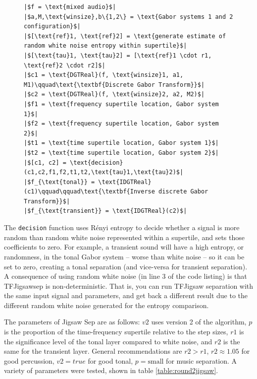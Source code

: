 \documentclass[letter,12pt]{article}
\newlength{\mintednumbersep}
\begin{document}
\begin{figure}[h]
  \centering
  \centering
\begin{verbatim}
|$f = \text{mixed audio}$|
|$a,M,\text{winsize},b\{1,2\} = \text{Gabor systems 1 and 2 configuration}$|
|$[\text{ref}1, \text{ref}2] = \text{generate estimate of random white noise entropy within supertile}$|
|$[\text{tau}1, \text{tau}2] = [\text{ref}1 \cdot r1, \text{ref}2 \cdot r2]$|
|$c1 = \text{DGTReal}(f, \text{winsize}1, a1, M1)\qquad\text{\textbf{Discrete Gabor Transform}}$|
|$c2 = \text{DGTReal}(f, \text{winsize}2, a2, M2)$|
|$f1 = \text{frequency supertile location, Gabor system 1}$|
|$f2 = \text{frequency supertile location, Gabor system 2}$|
|$t1 = \text{time supertile location, Gabor system 1}$|
|$t2 = \text{time supertile location, Gabor system 2}$|
|$[c1, c2] = \text{decision}(c1,c2,f1,f2,t1,t2,\text{tau}1,\text{tau}2)$|
|$f_{\text{tonal}} = \text{IDGTReal}(c1)\qquad\qquad\text{\textbf{Inverse discrete Gabor Transform}}$|
|$f_{\text{transient}} = \text{IDGTReal}(c2)$|
\end{verbatim}
  \label{lst:tfjigsaw}
\end{figure}

The \Verb#decision# function uses R{\'e}nyi entropy to decide whether a signal is more random than random white noise represented within a supertile, and sets those coefficients to zero. For example, a transient sound will have a high entropy, or randomness, in the tonal Gabor system -- worse than white noise -- so it can be set to zero, creating a tonal separation (and vice-versa for transient separation). A consequence of using random white noise (in line 3 of the code listing) is that TFJigsawsep is non-deterministic. That is, you can run TFJigsaw separation with the same input signal and parameters, and get back a different result due to the different random white noise generated for the entropy comparison.

The parameters of Jigsaw Sep are as follows: $v2$ uses version 2 of the algorithm, $p$ is the proportion of the time-frequency supertile relative to the step sizes, $r1$ is the significance level of the tonal layer compared to white noise, and $r2$ is the same for the transient layer. General recommendations are $r2 > r1$, $r2 \approx 1.05$ for good percussion, $v2 = true$ for good tonal, $p = \text{small}$ for music separation. A variety of parameters were tested, shown in table \ref{table:round2jigsaw}.
\end{document}
